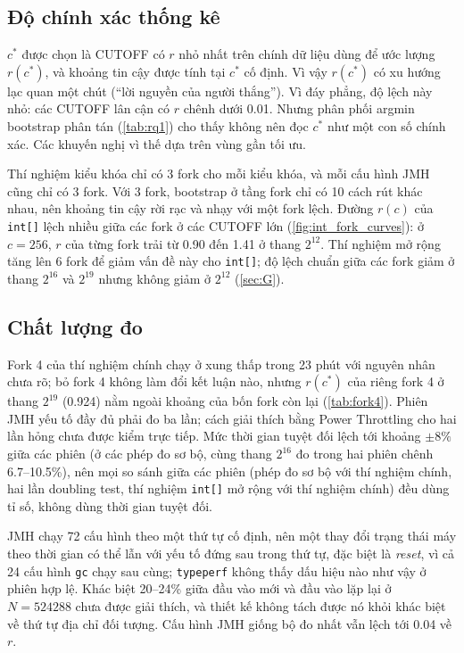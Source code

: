 \documentclass[12pt,a4paper]{article}
\begin{document}
\subsection{Độ chính xác thống kê}\label{sec:7.2}\label{sec:7.5}
$c^*$ được chọn là CUTOFF có $r$ nhỏ nhất trên chính dữ liệu dùng để ước lượng $r(c^*)$, và khoảng tin cậy được tính tại $c^*$ cố định. Vì vậy $r(c^*)$ có xu hướng lạc quan một chút (``lời nguyền của người thắng''). Vì đáy phẳng, độ lệch này nhỏ: các CUTOFF lân cận có $r$ chênh dưới 0.01. Nhưng phân phối argmin bootstrap phân tán (\cref{tab:rq1}) cho thấy không nên đọc $c^*$ như một con số chính xác. Các khuyến nghị vì thế dựa trên vùng gần tối ưu.

Thí nghiệm kiểu khóa chỉ có 3 fork cho mỗi kiểu khóa, và mỗi cấu hình JMH cũng chỉ có 3 fork. Với 3 fork, bootstrap ở tầng fork chỉ có 10 cách rút khác nhau, nên khoảng tin cậy rời rạc và nhạy với một fork lệch. Đường $r(c)$ của \texttt{int[]} lệch nhiều giữa các fork ở các CUTOFF lớn (\cref{fig:int_fork_curves}): ở $c = 256$, $r$ của từng fork trải từ 0.90 đến 1.41 ở thang $2^{12}$. Thí nghiệm mở rộng tăng lên 6 fork để giảm vấn đề này cho \texttt{int[]}; độ lệch chuẩn giữa các fork giảm ở thang $2^{16}$ và $2^{19}$ nhưng không giảm ở $2^{12}$ (\cref{sec:G}).

\subsection{Chất lượng đo}\label{sec:7.3}\label{sec:7.6}
Fork 4 của thí nghiệm chính chạy ở xung thấp trong 23 phút với nguyên nhân chưa rõ; bỏ fork 4 không làm đổi kết luận nào, nhưng $r(c^*)$ của riêng fork 4 ở thang $2^{19}$ (0.924) nằm ngoài khoảng của bốn fork còn lại (\cref{tab:fork4}). Phiên JMH yếu tố đầy đủ phải đo ba lần; cách giải thích bằng Power Throttling cho hai lần hỏng chưa được kiểm trực tiếp. Mức thời gian tuyệt đối lệch tới khoảng $\pm 8\%$ giữa các phiên (ở các phép đo sơ bộ, cùng thang $2^{16}$ đo trong hai phiên chênh 6.7--10.5\%), nên mọi so sánh giữa các phiên (phép đo sơ bộ với thí nghiệm chính, hai lần doubling test, thí nghiệm \texttt{int[]} mở rộng với thí nghiệm chính) đều dùng tỉ số, không dùng thời gian tuyệt đối.

JMH chạy 72 cấu hình theo một thứ tự cố định, nên một thay đổi trạng thái máy theo thời gian có thể lẫn với yếu tố đứng sau trong thứ tự, đặc biệt là \emph{reset}, vì cả 24 cấu hình \texttt{gc} chạy sau cùng; \texttt{typeperf} không thấy dấu hiệu nào như vậy ở phiên hợp lệ. Khác biệt 20--24\% giữa đầu vào mới và đầu vào lặp lại ở $N = \num{524288}$ chưa được giải thích, và thiết kế không tách được nó khỏi khác biệt về thứ tự địa chỉ đối tượng. Cấu hình JMH giống bộ đo nhất vẫn lệch tới 0.04 về $r$.
\end{document}
